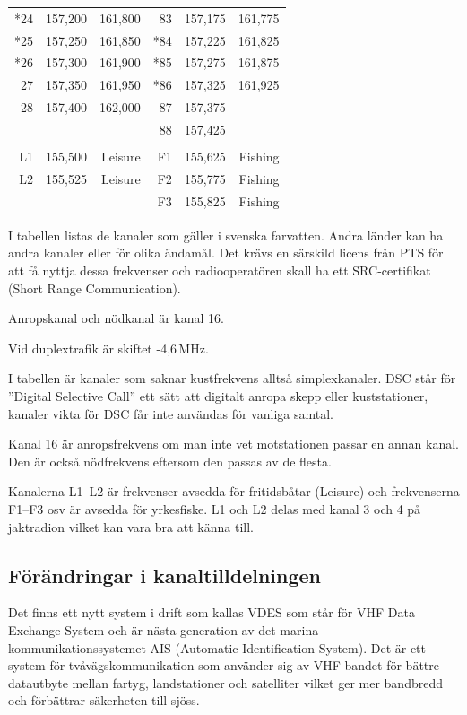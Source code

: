 \begin{longtable}{rrr|rrr}
*24 & 157,200 & 161,800       & 83  & 157,175 & 161,775 \\
*25 & 157,250 & 161,850       & *84 & 157,225 & 161,825 \\
*26 & 157,300 & 161,900       & *85 & 157,275 & 161,875 \\
27  & 157,350 & 161,950       & *86 & 157,325 & 161,925 \\
28  & 157,400 & 162,000       & 87  & 157,375 &         \\
    &         &               & 88  & 157,425 &         \\
    &         &               &     &         &         \\
L1  & 155,500 & Leisure       & F1  & 155,625 & Fishing \\
L2  & 155,525 & Leisure       & F2  & 155,775 & Fishing \\
    &         &               & F3  & 155,825 & Fishing \\

\end{longtable}

I tabellen listas de kanaler som gäller i svenska farvatten. Andra
länder kan ha andra kanaler eller för olika ändamål. Det krävs en
särskild licens från PTS för att få nyttja dessa frekvenser och
radiooperatören skall ha ett SRC-certifikat (Short Range
Communication).

Anropskanal och nödkanal är kanal 16.

Vid duplextrafik är skiftet -4,6\,MHz.

I tabellen är kanaler som saknar kustfrekvens alltså
simplexkanaler. DSC står för ''Digital Selective Call'' ett sätt att
digitalt anropa skepp eller kuststationer, kanaler vikta för DSC får
inte användas för vanliga samtal.

Kanal 16 är anropsfrekvens om man inte vet motstationen passar en
annan kanal. Den är också nödfrekvens eftersom den passas av de
flesta.

Kanalerna L1--L2 är frekvenser avsedda för fritidsbåtar (Leisure) och
frekvenserna F1--F3 osv är avsedda för yrkesfiske. L1 och L2 delas med
kanal 3 och 4 på jaktradion vilket kan vara bra att känna till.

\subsection{Förändringar i kanaltilldelningen}

Det finns ett nytt system i drift som kallas VDES som står för VHF Data Exchange
System och är nästa generation av det marina kommunikationssystemet AIS
(Automatic Identification System). Det är ett system för tvåvägskommunikation
som använder sig av VHF-bandet för bättre datautbyte mellan fartyg,
landstationer och satelliter vilket ger mer bandbredd och förbättrar säkerheten
till sjöss.

